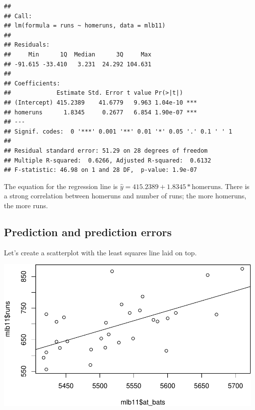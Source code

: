 \documentclass[]{article}
\newenvironment{Shaded}{\begin{snugshade}}{\end{snugshade}}
\newcommand{\KeywordTok}[1]{\textcolor[rgb]{0.13,0.29,0.53}{\textbf{#1}}}
\newcommand{\StringTok}[1]{\textcolor[rgb]{0.31,0.60,0.02}{#1}}
\newcommand{\OperatorTok}[1]{\textcolor[rgb]{0.81,0.36,0.00}{\textbf{#1}}}
\newcommand{\NormalTok}[1]{#1}
\begin{document}
\begin{verbatim}
## 
## Call:
## lm(formula = runs ~ homeruns, data = mlb11)
## 
## Residuals:
##     Min      1Q  Median      3Q     Max 
## -91.615 -33.410   3.231  24.292 104.631 
## 
## Coefficients:
##             Estimate Std. Error t value Pr(>|t|)    
## (Intercept) 415.2389    41.6779   9.963 1.04e-10 ***
## homeruns      1.8345     0.2677   6.854 1.90e-07 ***
## ---
## Signif. codes:  0 '***' 0.001 '**' 0.01 '*' 0.05 '.' 0.1 ' ' 1
## 
## Residual standard error: 51.29 on 28 degrees of freedom
## Multiple R-squared:  0.6266, Adjusted R-squared:  0.6132 
## F-statistic: 46.98 on 1 and 28 DF,  p-value: 1.9e-07
\end{verbatim}

The equation for the regression line is
\(\hat{y} = 415.2389 + 1.8345 * \text{homeruns}\). There is a strong
correlation between homeruns and number of runs; the more homeruns, the
more runs.

\subsection{Prediction and prediction
errors}\label{prediction-and-prediction-errors}

Let's create a scatterplot with the least squares line laid on top.

\begin{Shaded}
\end{Shaded}

\includegraphics{DATA_606_Lab_7_files/figure-latex/reg-with-line-1.pdf}
\end{document}
